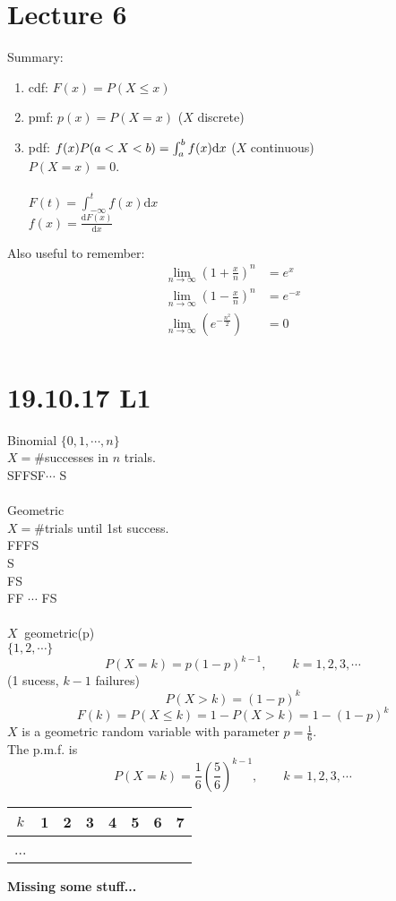 \documentclass{article}
\let\ddd\cdots
\theoremstyle{definition}
\theoremstyle{remark}
\theoremstyle{example}
\renewcommand{\d}{\mathrm{d}}
\newcommand{\dv}[2]{\frac{\d #1}{\d #2}}
\begin{document}
	\section*{Lecture 6}
	Summary:\begin{enumerate}
		\item cdf: $F(x)=P(X \leq x)$
		\item pmf: $p(x)=P(X=x)$ ($X$ discrete)
		\item pdf: $f(x)\\
		P(a <X<b)=\int_{a}^{b}f(x) \d x$ ($X$ continuous)\\
		$P(X=x)=0$.\\\\
		$F(t)=\int_{-\infty}^{t}f(x) \d x$\\
		$f(x)=\dv{F(x)}{x}$
		
	\end{enumerate}
	Also useful to remember:
	\begin{align}
		\lim\limits_{n \to \infty}(1+\frac{x}{n})^n&=e^x\\
		\lim\limits_{n \to \infty}(1-\frac{x}{n})^n&=e^{-x}\\
		\lim\limits_{n \to \infty}(e^{-\frac{n^2}{2}}) & = 0\\
	\end{align}
	
	\section*{19.10.17 L1}
	Binomial $\{0,1,\ddd,n\}$\\
	$X=\#$successes in $n$ trials.\\
	SFFSF$\ddd$ S\\
	\\
	Geometric\\
	$X=\#$trials until 1st success.\\
	FFFS\\
	S\\
	FS\\
	FF $\ddd$ FS\\
	\\
	$X ~ $ geometric(p)\\
	$\{1,2,\ddd\}$\\
	\[P(X=k)=p(1-p)^{k-1}, \qquad k=1,2,3,\ddd \]
	(1 sucess, $k-1$ failures)\\
	\[P(X>k)=(1-p)^k\]
	\[F(k)=P(X \leq k) = 1-P(X > k) = 1-(1-p)^k\]
	$X$ is a geometric random variable with parameter $p=\frac{1}{6}$.\\
	The p.m.f. is \[P(X=k)=\frac{1}{6}\left(\frac{5}{6}\right)^{k-1},\qquad k=1,2,3,\ddd\]	
	\begin{center}
		\begin{tabular}{ c|c c c c c c c } 
			$k$ & 1 & 2 & 3 & 4 & 5 & 6 & 7 \\ 
			\hline
			...
		\end{tabular}
	\end{center}
	\textbf{Missing some stuff...}
	
\end{document}
